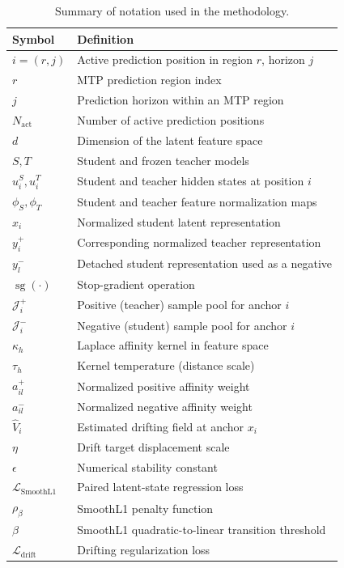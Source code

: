 \documentclass{article}
\begin{document}
\begin{table}[htbp]
\centering
\caption{Summary of notation used in the methodology.}
\label{tab:notation}
\small
\begin{tabular}{ll}
\toprule
Symbol & Definition \\
\midrule
$i=(r,j)$ & Active prediction position in region $r$, horizon $j$ \\
$r$ & MTP prediction region index \\
$j$ & Prediction horizon within an MTP region \\
$N_{\mathrm{act}}$ & Number of active prediction positions \\
$d$ & Dimension of the latent feature space \\
\midrule
$S,T$ & Student and frozen teacher models \\
$u_i^S,u_i^T$ & Student and teacher hidden states at position $i$ \\
$\phi_S,\phi_T$ & Student and teacher feature normalization maps \\
$x_i$ & Normalized student latent representation \\
$y_i^+$ & Corresponding normalized teacher representation \\
$y_l^-$ & Detached student representation used as a negative \\
$\operatorname{sg}(\cdot)$ & Stop-gradient operation \\
\midrule
$\mathcal J_i^+$ & Positive (teacher) sample pool for anchor $i$ \\
$\mathcal J_i^-$ & Negative (student) sample pool for anchor $i$ \\
$\kappa_h$ & Laplace affinity kernel in feature space \\
$\tau_h$ & Kernel temperature (distance scale) \\
$a_{il}^+$ & Normalized positive affinity weight \\
$a_{il}^-$ & Normalized negative affinity weight \\
$\widehat V_i$ & Estimated drifting field at anchor $x_i$ \\
$\eta$ & Drift target displacement scale \\
$\epsilon$ & Numerical stability constant \\
\midrule
$\mathcal L_{\mathrm{SmoothL1}}$ & Paired latent-state regression loss \\
$\rho_\beta$ & SmoothL1 penalty function \\
$\beta$ & SmoothL1 quadratic-to-linear transition threshold \\
$\mathcal L_{\mathrm{drift}}$ & Drifting regularization loss \\
\bottomrule
\end{tabular}
\end{table}
\end{document}

